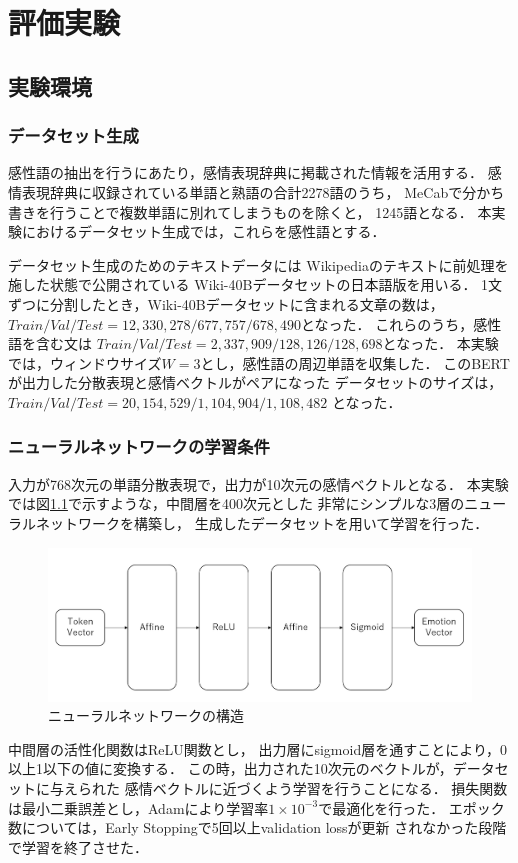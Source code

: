 \chapter{評価実験}

\label{chap:evaluation}

\section{実験環境}
	\subsection{データセット生成}
		感性語の抽出を行うにあたり，感情表現辞典に掲載された情報を活用する．
		感情表現辞典に収録されている単語と熟語の合計2278語のうち，
		MeCabで分かち書きを行うことで複数単語に別れてしまうものを除くと，
		1245語となる．
		本実験におけるデータセット生成では，これらを感性語とする．

		データセット生成のためのテキストデータには
		Wikipediaのテキストに前処理を施した状態で公開されている
		Wiki-40Bデータセットの日本語版を用いる．
		1文ずつに分割したとき，Wiki-40Bデータセットに含まれる文章の数は，
		$Train/Val/Test=12,330,278/677,757/678,490$となった．
		これらのうち，感性語を含む文は
		$Train/Val/Test=2,337,909/128,126/128,698$となった．
		本実験では，ウィンドウサイズ$W=3$とし，感性語の周辺単語を収集した．
		このBERTが出力した分散表現と感情ベクトルがペアになった
		データセットのサイズは，
		$Train/Val/Test=20,154,529/1,104,904/1,108,482$
		となった．

	\subsection{ニューラルネットワークの学習条件}
		入力が768次元の単語分散表現で，出力が10次元の感情ベクトルとなる．
		本実験では図\ref{fig:network}で示すような，中間層を400次元とした
		非常にシンプルな3層のニューラルネットワークを構築し，
		生成したデータセットを用いて学習を行った．
		\begin{figure}[H]
			\centering
			\includegraphics[width=\linewidth]{./figure/network.png}
			\caption{ニューラルネットワークの構造}
			\label{fig:network}
		\end{figure}
		中間層の活性化関数はReLU関数とし，
		出力層にsigmoid層を通すことにより，0以上1以下の値に変換する．
		この時，出力された10次元のベクトルが，データセットに与えられた
		感情ベクトルに近づくよう学習を行うことになる．
		損失関数は最小二乗誤差とし，Adamにより学習率$1\times10^{-3}$で最適化を行った．
		エポック数については，Early Stoppingで5回以上validation lossが更新
		されなかった段階で学習を終了させた．
		
